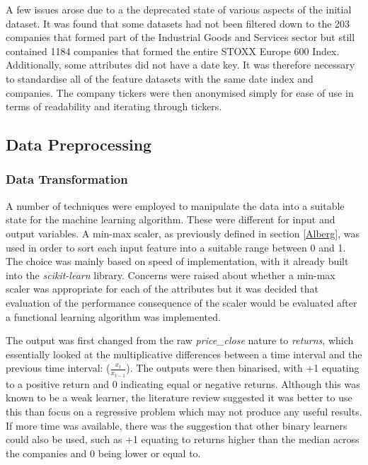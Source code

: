 \documentclass[10pt,onecolumn,letterpaper]{article}
\begin{document}
A few issues arose due to a the deprecated state of various aspects of the initial dataset. It was found that some datasets had not been filtered down to the 203 companies that formed part of the Industrial Goods and Services sector but still contained 1184 companies that formed the entire STOXX Europe 600 Index. Additionally, some attributes did not have a date key. It was therefore necessary to standardise all of the feature datasets with the same date index and companies. The company tickers were then anonymised simply for ease of use in terms of readability and iterating through tickers. 

\subsection{Data Preprocessing} \label{data preprocess}

\subsubsection{Data Transformation} \label{data transformation}

A number of techniques were employed to manipulate the data into a suitable state for the machine learning algorithm. These were different for input and output variables. A min-max scaler, as previously defined in section \ref{Alberg}, was used in order to sort each input feature into a suitable range between 0 and 1. The choice was mainly based on speed of implementation, with it already built into the \textit{scikit-learn} library. Concerns were raised about whether a min-max scaler was appropriate for each of the attributes but it was decided that evaluation of the performance consequence of the scaler would be evaluated after a functional learning algorithm was implemented. 

The output was first changed from the raw \textit{price\_close} nature to \textit{returns}, which essentially looked at the multiplicative differences between a time interval and the previous time interval: ($\frac{x_{t}}{x_{t-1}}$). The outputs were then binarised, with +1 equating to a positive return and 0 indicating equal or negative returns. Although this was known to be a weak learner, the literature review suggested it was better to use this than focus on a regressive problem which may not produce any useful results. If more time was available, there was the suggestion that other binary learners could also be used, such as +1 equating to returns higher than the median across the companies and 0 being lower or equal to. 
\end{document}
